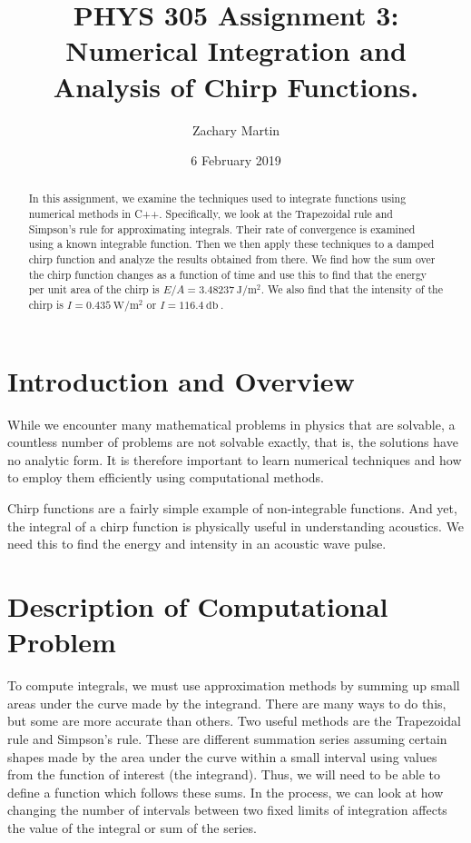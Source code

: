 \documentclass[aps,prl,twocolumn,superscriptaddress]{revtex4-1}
\begin{document}
\title{PHYS 305 Assignment 3: Numerical Integration and Analysis of Chirp Functions.}
\author{Zachary Martin}
\date{6 February 2019}

\begin{abstract}
In this assignment, we examine the techniques used to integrate functions using numerical methods in C++. Specifically, we look at the Trapezoidal rule and Simpson's rule for approximating integrals. Their rate of convergence is examined using a known integrable function. Then we then apply these techniques to a damped chirp function and analyze the results obtained from there. We find how the sum over the chirp function changes as a function of time and use this to find that the energy per unit area of the chirp is $E/A = \SI{3.48237}{\joule\per\m\squared}$. We also find that the intensity of the chirp is $I = \SI{0.435}{\watt\per\m\squared}$ or $I = \SI{116.4}{\decibel}~$.
\end{abstract}

\maketitle

\section{Introduction and Overview}
While we encounter many mathematical problems in physics that are solvable, a countless number of problems are not solvable exactly, that is, the solutions have no analytic form. It is therefore important to learn numerical techniques and how to employ them efficiently using computational methods.

Chirp functions are a fairly simple example of non-integrable functions. And yet, the integral of a chirp function is physically useful in understanding acoustics. We need this to find the energy and intensity in an acoustic wave pulse.
 
\section{Description of Computational Problem}
To compute integrals, we must use approximation methods by summing up small areas under the curve made by the integrand. There are many ways to do this, but some are more accurate than others. Two useful methods are the Trapezoidal rule and Simpson's rule. These are different summation series assuming certain shapes made by the area under the curve within a small interval using values from the function of interest (the integrand).   Thus, we will need to be able to define a function which follows these sums. In the process, we can look at how changing the number of intervals between two fixed limits of integration affects the value of the integral or sum of the series.
\end{document}
